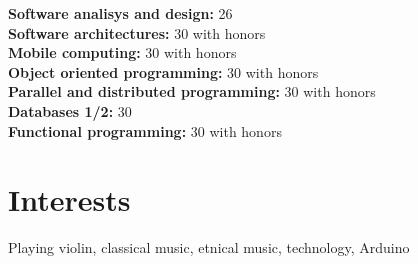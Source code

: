 \documentclass[letterpaper]{twentysecondcv}
\begin{document}
\textbf{Software analisys and design: } 26\\
\textbf{Software architectures: } 30 with honors\\
\textbf{Mobile computing: } 30 with honors\\
\textbf{Object oriented programming: } 30 with honors\\
\textbf{Parallel and distributed programming: } 30 with honors\\
\textbf{Databases 1/2: } 30\\
\textbf{Functional programming: } 30 with honors\\


\section{Interests}

Playing violin, classical music, etnical music, technology, Arduino

\cvprivacy
\end{document}
